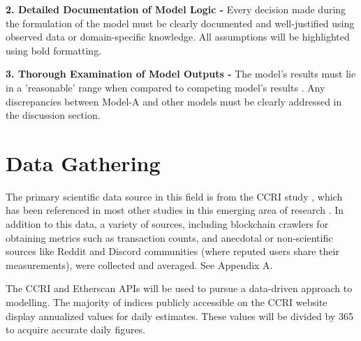 \textbf{2. Detailed Documentation of Model Logic - }
Every decision made during the formulation of the model must be clearly documented and well-justified using observed data or domain-specific knowledge. All assumptions will be highlighted using bold formatting.


\textbf{3. Thorough Examination of Model Outputs - }
The model's results must lie in a 'reasonable' range when compared to competing model's results \cite{Al-Aomar2015ModelTechniques}. Any discrepancies between Model-A and other models must be clearly addressed in the discussion section.   

\section {Data Gathering}

The primary scientific data source in this field is from the CCRI study \cite{CryptoCarbonRatingsInstitute2022TheNetwork}, which has been referenced in most other studies in this emerging area of research \cite{IbanezTheExpansion}. In addition to this data, a variety of sources, including blockchain crawlers for obtaining metrics such as transaction counts, and anecdotal or non-scientific sources like Reddit and Discord communities (where reputed users share their measurements), were collected and averaged. See Appendix A.

The CCRI \cite{Ccri-apiOverview} and Etherscan \cite{EtherscanProvider} APIs will be used to pursue a data-driven approach to modelling. The majority of indices publicly accessible on the CCRI website display annualized values for daily estimates. These values will be divided by 365 to acquire accurate daily figures.





